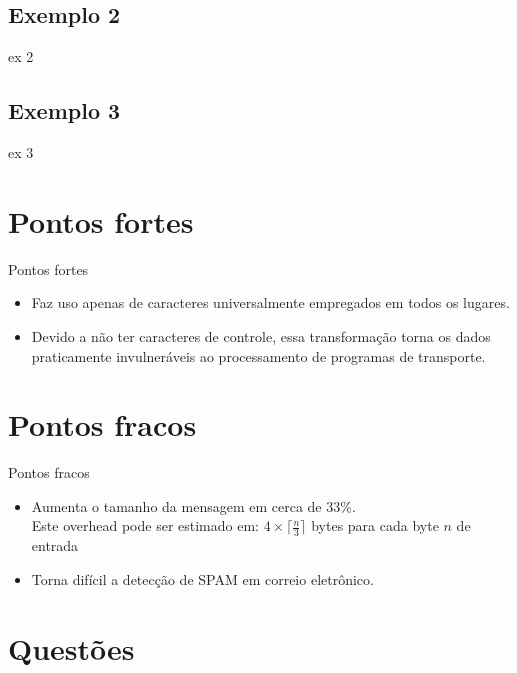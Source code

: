 \documentclass[pdf]{beamer}
\begin{document}
\subsection{Exemplo 2}
\begin{frame}
\transdissolve
ex 2
\end{frame}
\subsection{Exemplo 3}
\begin{frame}
\transdissolve
ex 3
\end{frame}
\section{Pontos fortes}
\begin{frame}{Pontos fortes}
\transdissolve
\begin{itemize}
\item Faz uso apenas de caracteres universalmente empregados em todos os lugares.
\item Devido a não ter caracteres de controle, essa transformação torna os dados praticamente invulneráveis ao processamento de programas de transporte.
\end{itemize}
\end{frame}
\section{Pontos fracos}
\begin{frame}{Pontos fracos}
\transdissolve
\begin{itemize}
\item Aumenta o tamanho da mensagem em cerca de 33\%. \\
Este overhead pode ser estimado em: $4 \times \lceil \frac{n}{3} \rceil$ bytes para cada byte $n$ de entrada
\item Torna difícil a detecção de SPAM em correio eletrônico.
\end{itemize}
\end{frame}
\section{Questões}
\end{document}
